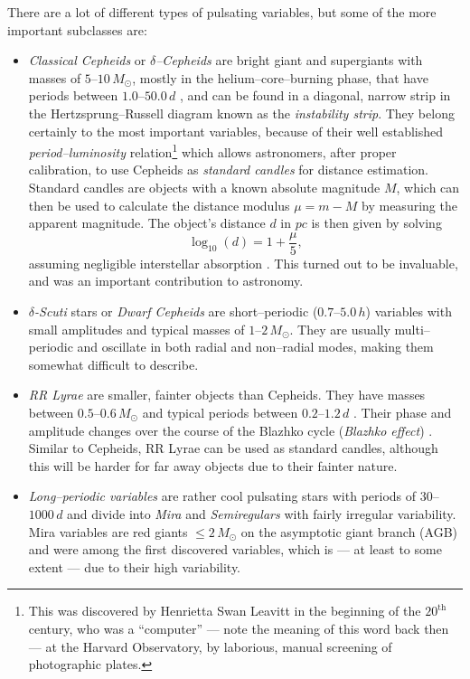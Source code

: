 \begin{itemize}
There are a lot of different types of pulsating variables, but  some of the more important subclasses are:
	\begin{itemize}[label=$\circ$]
	\item \emph{Classical Cepheids} or \emph{$\delta$--Cepheids} are bright giant and supergiants with masses of $5$--$10 \, \unit{M_\odot}$, mostly in the helium--core--burning phase, that have periods between $1.0$--$50.0 \, \unit{d}$ \citep{cox1980}, and can be found in a diagonal, narrow strip in the Hertzsprung--Russell diagram known as the \emph{instability strip}. They belong certainly to the most important variables, because of their well established \emph{period--luminosity} relation\footnote{This was discovered by Henrietta Swan Leavitt in the beginning of the $20^\text{th}$ century, who was a ``computer'' --- note the meaning of this word back then --- at the Harvard Observatory, by laborious, manual screening of photographic plates.}
	which allows astronomers, after proper calibration, to use Cepheids as \emph{standard candles} for distance estimation. Standard candles are objects with a known absolute magnitude $M$, which can then be used to calculate the distance modulus $\mu = m - M$ by measuring the apparent magnitude. The object's distance $d$ in $\unit{pc}$ is then given by solving
	\begin{equation}
	\log_{10}(d) = 1 + \frac{\mu}{5},
	\end{equation}
	assuming negligible interstellar absorption \citep{hanslmeier2007}. This turned out to be invaluable, and was an important contribution to astronomy.
	\item \emph{$\delta$-Scuti} stars or \emph{Dwarf Cepheids} are short--periodic ($0.7$--$5.0 \, \unit{h}$) variables with small amplitudes and typical masses of $1$--$2 \, \unit{M_\odot}$. They are usually multi--periodic and oscillate in both radial and non--radial modes, making them somewhat difficult to describe.
	\item \emph{RR Lyrae} are smaller, fainter objects than Cepheids. They have masses between $0.5$--$0.6 \, \unit{M_\odot}$ and typical periods between $0.2 $--$1.2 \, \unit{d}$ \citep{unsoeld2001}. Their phase and amplitude changes over the course of the Blazhko cycle (\emph{Blazhko effect}) \citep{soszy2008}. Similar to Cepheids, RR Lyrae can be used as standard candles, although this will be harder for far away objects due to their fainter nature.
	\item \emph{Long--periodic variables} are rather cool pulsating stars with periods of $30$--$1000 \, \unit{d}$ and divide into \emph{Mira} and \emph{Semiregulars} with fairly irregular variability. Mira variables are red giants $\le 2 \, \unit{M_\odot}$ on the asymptotic giant branch (AGB) \citep{unsoeld2001} and were among the first discovered variables, which is --- at least to some extent --- due to their high variability.
	\end{itemize}


\end{itemize}
